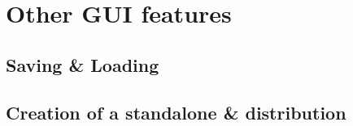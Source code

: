 

\section{Other GUI features} %
\label{sec:other_gui_features}

	\subsection{Saving \& Loading} %
	\label{sec:saving_and_loading}
	

	\subsection{Creation of a standalone \& distribution} %
	\label{sec:creation_of_a_standalone_and_distribution}
	





